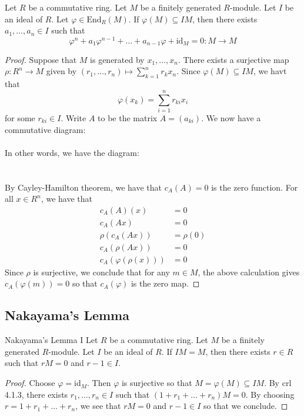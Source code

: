 \documentclass[a4paper]{article}
\begin{document}
\begin{crl}{}{} Let $R$ be a commutative ring. Let $M$ be a finitely generated $R$-module. Let $I$ be an ideal of $R$. Let $\varphi\in\text{End}_R(M)$. If $\varphi(M)\subseteq IM$, then there exists $a_1,\dots,a_n\in I$ such that $$\varphi^n+a_1\varphi^{n-1}+\dots+a_{n-1}\varphi+\text{id}_M=0:M\to M$$ \tcbline
\begin{proof}
Suppose that $M$ is generated by $x_1,\dots,x_n$. There exists a surjective map $\rho:R^n\to M$ given by $(r_1,\dots,r_n)\mapsto\sum_{k=1}^nr_kx_n$. Since $\varphi(M)\subseteq IM$, we havt that $$\varphi(x_k)=\sum_{i=1}^nr_{ki}x_i$$ for some $r_{ki}\in I$. Write $A$ to be the matrix $A=(a_{ki})$. We now have a commutative diagram: \\~\\
In other words, we have the diagram: \\
\\~\\
By Cayley-Hamilton theorem, we have that $c_A(A)=0$ is the zero function. For all $x\in R^n$, we have that 
\begin{align*}
c_A(A)(x)&=0\\
c_A(Ax)&=0\\
\rho(c_A(Ax))&=\rho(0)\\
c_A(\rho(Ax))&=0\tag{$\rho$ is $R$-linear}\\
c_A(\varphi(\rho(x)))&=0\tag{Diagram is commutative}
\end{align*}
Since $\rho$ is surjective, we conclude that for any $m\in M$, the above calculation gives $c_A(\varphi(m))=0$ so that $c_A(\varphi)$ is the zero map. 
\end{proof}
\end{crl}

\subsection{Nakayama's Lemma}
\begin{lmm}{Nakayama's Lemma I}{} Let $R$ be a commutative ring. Let $M$ be a finitely generated $R$-module. Let $I$ be an ideal of $R$. If $IM=M$, then there exists $r\in R$ such that $rM=0$ and $r-1\in I$. \tcbline
\begin{proof}
Choose $\varphi=\text{id}_M$. Then $\varphi$ is surjective so that $M=\varphi(M)\subseteq IM$. By crl 4.1.3, there exists $r_1,\dots,r_n\in I$ such that $(1+r_1+\dots+r_n)M=0$. By choosing $r=1+r_1+\dots+r_n$, we see that $rM=0$ and $r-1\in I$ so that we conclude. 
\end{proof}
\end{lmm}
\end{document}
